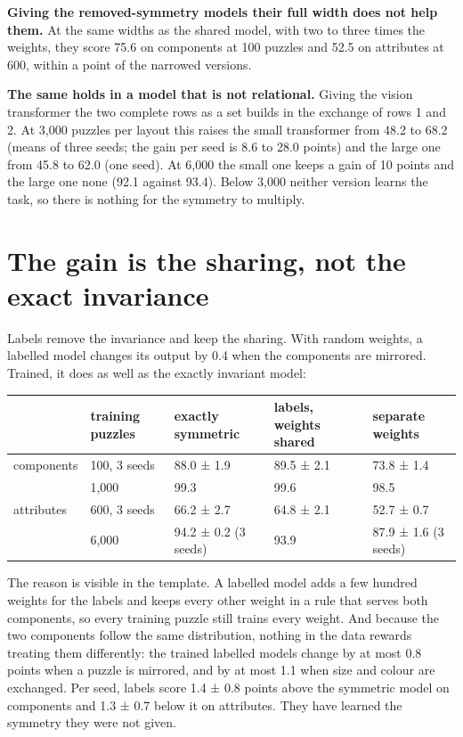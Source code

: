 \textbf{Giving the removed-symmetry models their full width does not help them.} At the same widths as the shared model, with two to three times the weights, they score 75.6 on components at 100 puzzles and 52.5 on attributes at 600, within a point of the narrowed versions.

\textbf{The same holds in a model that is not relational.} Giving the vision transformer the two complete rows as a set builds in the exchange of rows 1 and 2. At 3,000 puzzles per layout this raises the small transformer from 48.2 to 68.2 (means of three seeds; the gain per seed is 8.6 to 28.0 points) and the large one from 45.8 to 62.0 (one seed). At 6,000 the small one keeps a gain of 10 points and the large one none (92.1 against 93.4). Below 3,000 neither version learns the task, so there is nothing for the symmetry to multiply.

\section{The gain is the sharing, not the exact invariance}\label{sec:6.3}

Labels remove the invariance and keep the sharing. With random weights, a labelled model changes its output by 0.4 when the components are mirrored. Trained, it does as well as the exactly invariant model:

\begin{center}\small
\begin{tabularx}{\linewidth}{@{}llYYY@{}}
\toprule
 & training puzzles & exactly symmetric & labels, weights shared & separate weights \\
\midrule
components & 100, 3 seeds & 88.0 ± 1.9 & 89.5 ± 2.1 & 73.8 ± 1.4 \\
 & 1,000 & 99.3 & 99.6 & 98.5 \\
attributes & 600, 3 seeds & 66.2 ± 2.7 & 64.8 ± 2.1 & 52.7 ± 0.7 \\
 & 6,000 & 94.2 ± 0.2 (3 seeds) & 93.9 & 87.9 ± 1.6 (3 seeds) \\
\bottomrule
\end{tabularx}
\end{center}

The reason is visible in the template. A labelled model adds a few hundred weights for the labels and keeps every other weight in a rule that serves both components, so every training puzzle still trains every weight. And because the two components follow the same distribution, nothing in the data rewards treating them differently: the trained labelled models change by at most 0.8 points when a puzzle is mirrored, and by at most 1.1 when size and colour are exchanged. Per seed, labels score 1.4 ± 0.8 points above the symmetric model on components and 1.3 ± 0.7 below it on attributes. They have learned the symmetry they were not given.

